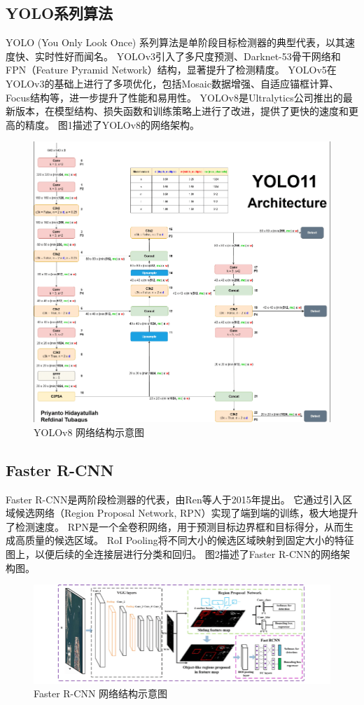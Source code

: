 \subsection{YOLO系列算法}
YOLO (You Only Look Once) 系列算法是单阶段目标检测器的典型代表，以其速度快、实时性好而闻名。
YOLOv3引入了多尺度预测、Darknet-53骨干网络和FPN（Feature Pyramid Network）结构，显著提升了检测精度。
YOLOv5在YOLOv3的基础上进行了多项优化，包括Mosaic数据增强、自适应锚框计算、Focus结构等，进一步提升了性能和易用性。
YOLOv8是Ultralytics公司推出的最新版本，在模型结构、损失函数和训练策略上进行了改进，提供了更快的速度和更高的精度。
图1描述了YOLOv8的网络架构。
\begin{figure}[h!]
    \centering
    \includegraphics[width=\textwidth]{imgs/yolo11-architecture}
    \caption{YOLOv8 网络结构示意图}
    \label{图1：}
\end{figure}

\subsection{Faster R-CNN}
Faster R-CNN是两阶段检测器的代表，由Ren等人于2015年提出。
它通过引入区域候选网络（Region Proposal Network, RPN）实现了端到端的训练，极大地提升了检测速度。
RPN是一个全卷积网络，用于预测目标边界框和目标得分，从而生成高质量的候选区域。
RoI Pooling将不同大小的候选区域映射到固定大小的特征图上，以便后续的全连接层进行分类和回归。
图2描述了Faster R-CNN的网络架构图。
\begin{figure}[h!]
    \centering
    \includegraphics[width=\textwidth]{imgs/The-architecture-of-Faster-R-CNN}
    \caption{Faster R-CNN 网络结构示意图}
    \label{图2：}
\end{figure}